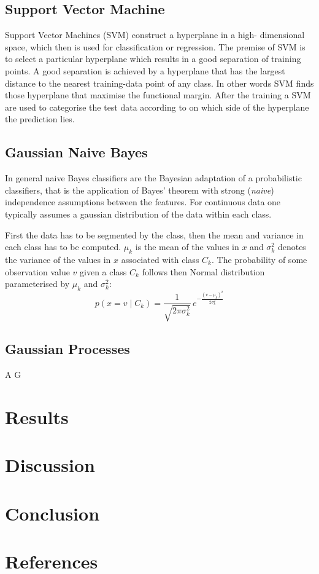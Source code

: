 \documentclass[a4paper,11pt]{article}
\begin{document}
\subsection{Support Vector Machine}

Support Vector Machines (SVM) construct a hyperplane in a high- dimensional space, which then is  used for classification or regression. The premise of SVM is to select a particular hyperplane which results in a  good separation of training points. A good separation is achieved by a hyperplane that has the largest distance to the nearest training-data point of any class. In other words SVM finds those hyperplane that maximise the  functional margin. After the training a SVM are used to categorise the test data according to on which side of the hyperplane the prediction lies.

\subsection{Gaussian Naive Bayes}

In general naive Bayes classifiers are the Bayesian adaptation of a probabilistic classifiers, that is the application of Bayes' theorem with strong (\textit{naive}) independence assumptions between the features.
For continuous data one typically assumes a gaussian distribution of the data within each class.

First the data has to be segmented by the class, then the mean and variance in each class has to be computed. $ \mu _{k}$ is the mean of the values in $x$ and  $ \sigma _{k}^{2}$ denotes the variance of the values in $x$ associated with class $C_k$.
The probability of some observation value $v$ given a class $C_{k}$ follows then Normal distribution parameterised by $\mu _{k}$ and $\sigma _{k}^{2}$: 
$$  p(x=v\mid C_{k})={\frac {1}{\sqrt {2\pi \sigma _{k}^{2}}}}\,e^{-{\frac {(v-\mu _{k})^{2}}{2\sigma _{k}^{2}}}} $$

\subsection{Gaussian Processes}

A G

\section{Results}

\section{Discussion}

\section{Conclusion}

\section{References}
%
%
\end{document}

